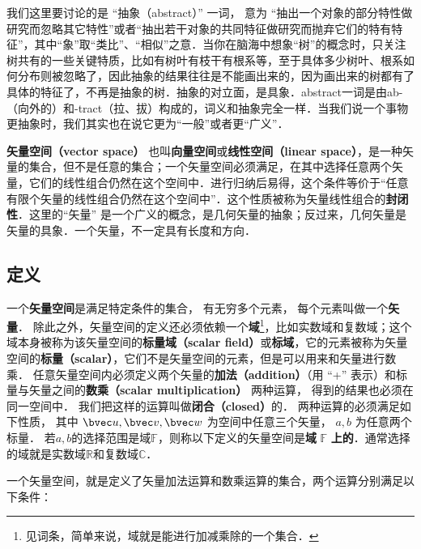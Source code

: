 


我们这里要讨论的是 “抽象（abstract）” 一词， 意为 “抽出一个对象的部分特性做研究而忽略其它特性”或者“抽出若干对象的共同特征做研究而抛弃它们的特有特征”，其中“象”取“类比”、“相似”之意．当你在脑海中想象“树”的概念时，只关注树共有的一些关键特质，比如有树叶有枝干有根系等，至于具体多少树叶、根系如何分布则被忽略了，因此抽象的结果往往是不能画出来的，因为画出来的树都有了具体的特征了，不再是抽象的树．抽象的对立面，是具象．abstract一词是由ab-（向外的）和-tract（拉、拔）构成的，词义和抽象完全一样．当我们说一个事物更抽象时，我们其实也在说它更为“一般”或者更“广义”．

\textbf{矢量空间（vector space）} 也叫\textbf{向量空间}或\textbf{线性空间（linear space）}，是一种矢量的集合，但不是任意的集合；一个矢量空间必须满足，在其中选择任意两个矢量，它们的线性组合仍然在这个空间中．进行归纳后易得，这个条件等价于“任意有限个矢量的线性组合仍然在这个空间中”．这个性质被称为矢量线性组合的\textbf{封闭性}．这里的“矢量” 是一个广义的概念，是几何矢量的抽象；反过来，几何矢量是矢量的具象．一个矢量，不一定具有长度和方向．

\subsection{定义}
一个\textbf{矢量空间}是满足特定条件的集合， 有无穷多个元素， 每个元素叫做一个\textbf{矢量}． 除此之外，矢量空间的定义还必须依赖一个\textbf{域}\footnote{见词条，简单来说，域就是能进行加减乘除的一个集合．}，比如实数域和复数域；这个域本身被称为该矢量空间的\textbf{标量域（scalar field）}或\textbf{标域}，它的元素被称为矢量空间的\textbf{标量（scalar）}，它们不是矢量空间的元素，但是可以用来和矢量进行数乘． 任意矢量空间内必须定义两个矢量的\textbf{加法（addition）}（用 “+” 表示）和标量与矢量之间的\textbf{数乘（scalar multiplication）} 两种运算， 得到的结果也必须在同一空间中． 我们把这样的运算叫做\textbf{闭合（closed）}的． 两种运算的必须满足如下性质， 其中 $\bvec u,\bvec v,\bvec w$ 为空间中任意三个矢量， $a,b$ 为任意两个标量． 若$a,b$的选择范围是域$\mathbb{F}$，则称以下定义的矢量空间是\textbf{域} $\mathbb{F}$ \textbf{上的}．通常选择的域就是实数域$\mathbb{R}$和复数域$\mathbb{C}$．

一个矢量空间，就是定义了矢量加法运算和数乘运算的集合，两个运算分别满足以下条件：


